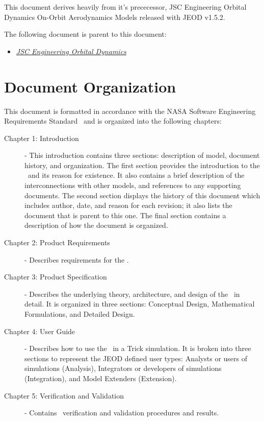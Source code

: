 This document derives heavily from it's prececessor,
JSC Engineering Orbital Dynamics On-Orbit Aerodynamics Models
released with JEOD v1.5.2.

The following document is parent to this document:
\begin{itemize}
\item{\href{file:\JEODHOME/docs/JEOD.pdf}
           {\em JSC Engineering Orbital Dynamics}}
\cite{dynenv:JEOD}
\end{itemize}

\section{Document Organization}
This document is formatted in accordance with the
NASA Software Engineering Requirements Standard~\cite{NASA:SWE}
and is organized into the following chapters:

\begin{description}

\item[Chapter 1: Introduction] -
This introduction contains three sections: description of model, document history, and organization.
The first section provides the introduction to the \aerodynamicsDesc\ and its reason
for existence.  It also contains a brief description of the interconnections with other models, and
references to any supporting documents.  The second section displays the history of this document which includes
author, date, and reason for each revision; it also lists the document that is parent to this one.  The final
section contains a description of how the document is organized.

\item[Chapter 2: Product Requirements] -
Describes requirements for the \aerodynamicsDesc.

\item[Chapter 3: Product Specification] -
Describes the underlying theory, architecture, and design of the \aerodynamicsDesc\ in detail.  It is organized in
three sections: Conceptual Design, Mathematical Formulations, and Detailed Design.

\item[Chapter 4: User Guide] -
Describes how to use the \aerodynamicsDesc\ in a Trick simulation.  It is broken into three sections to represent the JEOD
defined user types: Analysts or users of simulations (Analysis), Integrators or developers of simulations (Integration),
and Model Extenders (Extension).

\item[Chapter 5: Verification and Validation] -
Contains \aerodynamicsDesc\ verification and validation procedures and results.

\end{description}

